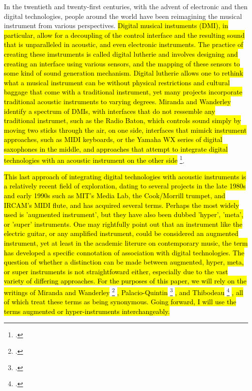 \documentclass[12pt,twoside,maitrise]{dms_ks}
\theoremstyle{definition}
\begin{document}
In the twentieth and twenty-first centuries, with the advent of electronic and then digital technologies, people around the world have been reimagining the musical instrument from various perspectives. 
\hl{Digital musical instuments (DMI), in particular, allow for a decoupling of the control interface and the resulting sound that is unparalleled in acoustic, and even electronic instruments.
The practice of creating these imstruments is called digital lutherie and involves designing and creating an interface using various sensors, and the mapping of these sensors to some kind of sound generation mechanism.
Digital lutherie allows one to rethink what a musical instrument can be without physical restrictions and cultural baggage that come with a traditional instrument, yet many projects incorporate traditional acoustic instruments to varying degrees. 
Miranda and Wanderley identify a spectrum of DMIs, with interfaces that do not ressemble any traditional instrumet, such as the Radio Baton, which controls sound simply by moving two sticks through the air, on one side, interfaces that mimick instrument approaches, such as MIDI keyboards, or the Yamaha WX series of digital saxophones in the middle, and approaches that attempt to integrate digital technologies with an acoustic instrument on the other side} \footcite[19-20]{miranda_new_2006}.


\hl{This last approach of integrating digital technologies with acoustic instruments is a relatively recent field of exploration, dating to several projects in the late 1980s and early 1990s such as MIT's Media Lab, the Cook/Morrill trumpet, and IRCAM's MIDI flute, and has acquired several terms.
Perhaps the most widely used is 'augmented instrument', but they have also been dubbed 'hyper', 'meta', or 'super' instruments.
One may rightfully point out that an instrument like the electric guitar, or any amplified instrument, could be considered an augmented instrument, yet at least in the academic literure on contemporary music, the term has developed a specific connotation of association with digital technologies. 
The question of whether a distinction can be made between augmented, hyper, meta, or super instruments is not straightfoward either, especially due to the vast variety of differing approaches.
For the purposes of this paper, we will rely on the writings of Miranda and Wanderley} \footcite[21]{miranda_new_2006} \hl{, Palacio-Quintin} \footcite[25]{palacio-quintin_composition_2012-1} \hl{, and Thibodeau } \footcite[1]{thibodeau_trumpet_nodate} \hl{, all of which treat these terms as being synonymous.
Going forward, I will use the terms augmented or hyper-instruments interchangeably.}
\end{document}
